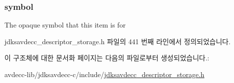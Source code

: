 \subsubsection[{\texorpdfstring{symbol}{symbol}}]{ symbol}\hypertarget{structjdksavdecc__descriptor__storage__symbol__dispatch__item_a0a81ee27053a63e71a6c7db060562eb0}{}\label{structjdksavdecc__descriptor__storage__symbol__dispatch__item_a0a81ee27053a63e71a6c7db060562eb0}
The opaque symbol that this item is for 

jdksavdecc\+\_\+descriptor\+\_\+storage.\+h 파일의 441 번째 라인에서 정의되었습니다.



이 구조체에 대한 문서화 페이지는 다음의 파일로부터 생성되었습니다.\+:\begin{DoxyCompactItemize}
\item 
avdecc-\/lib/jdksavdecc-\/c/include/\hyperlink{jdksavdecc__descriptor__storage_8h}{jdksavdecc\+\_\+descriptor\+\_\+storage.\+h}\end{DoxyCompactItemize}

